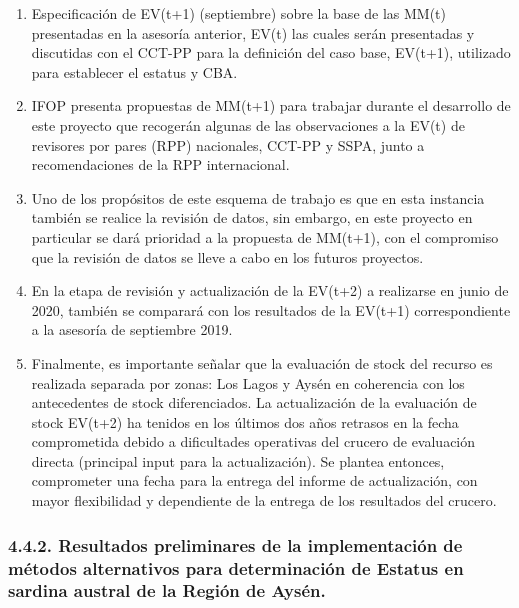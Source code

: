 \documentclass[
  spanish,
]{article}
\begin{document}
\begin{enumerate}
\def\labelenumi{\roman{enumi})}
\item
  Especificación de EV(t+1) (septiembre) sobre la base de las MM(t)
  presentadas en la asesoría anterior, EV(t) las cuales serán
  presentadas y discutidas con el CCT-PP para la definición del caso
  base, EV(t+1), utilizado para establecer el estatus y CBA.
\item
  IFOP presenta propuestas de MM(t+1) para trabajar durante el
  desarrollo de este proyecto que recogerán algunas de las observaciones
  a la EV(t) de revisores por pares (RPP) nacionales, CCT-PP y SSPA,
  junto a recomendaciones de la RPP internacional.
\item
  Uno de los propósitos de este esquema de trabajo es que en esta
  instancia también se realice la revisión de datos, sin embargo, en
  este proyecto en particular se dará prioridad a la propuesta de
  MM(t+1), con el compromiso que la revisión de datos se lleve a cabo en
  los futuros proyectos.
\item
  En la etapa de revisión y actualización de la EV(t+2) a realizarse en
  junio de 2020, también se comparará con los resultados de la EV(t+1)
  correspondiente a la asesoría de septiembre 2019.
\item
  Finalmente, es importante señalar que la evaluación de stock del
  recurso es realizada separada por zonas: Los Lagos y Aysén en
  coherencia con los antecedentes de stock diferenciados. La
  actualización de la evaluación de stock EV(t+2) ha tenidos en los
  últimos dos años retrasos en la fecha comprometida debido a
  dificultades operativas del crucero de evaluación directa (principal
  input para la actualización). Se plantea entonces, comprometer una
  fecha para la entrega del informe de actualización, con mayor
  flexibilidad y dependiente de la entrega de los resultados del
  crucero.
\end{enumerate}

\vspace{0.5cm}

\hypertarget{resultados-preliminares-de-la-implementaciuxf3n-de-muxe9todos-alternativos-para-determinaciuxf3n-de-estatus-en-sardina-austral-de-la-regiuxf3n-de-aysuxe9n.}{%
\subsubsection{4.4.2. Resultados preliminares de la implementación de
métodos alternativos para determinación de Estatus en sardina austral de
la Región de
Aysén.}\label{resultados-preliminares-de-la-implementaciuxf3n-de-muxe9todos-alternativos-para-determinaciuxf3n-de-estatus-en-sardina-austral-de-la-regiuxf3n-de-aysuxe9n.}}
\end{document}
